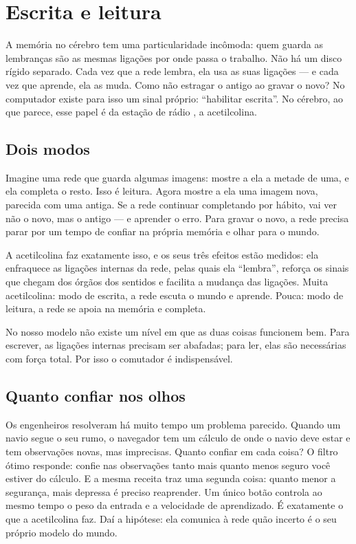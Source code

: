 \chapter{Escrita e leitura}

A memória no cérebro tem uma particularidade incômoda: quem guarda as lembranças são as mesmas ligações por onde passa o trabalho. Não há um disco rígido separado. Cada vez que a rede lembra, ela usa as suas ligações --- e cada vez que aprende, ela as muda. Como não estragar o antigo ao gravar o novo? No computador existe para isso um sinal próprio: ``habilitar escrita''. No cérebro, ao que parece, esse papel é da estação de rádio , a acetilcolina.

\section*{Dois modos}

Imagine uma rede que guarda algumas imagens: mostre a ela a metade de uma, e ela completa o resto. Isso é leitura. Agora mostre a ela uma imagem nova, parecida com uma antiga. Se a rede continuar completando por hábito, vai ver não o novo, mas o antigo --- e aprender o erro. Para gravar o novo, a rede precisa parar por um tempo de confiar na própria memória e olhar para o mundo.


A acetilcolina faz exatamente isso, e os seus três efeitos estão medidos: ela enfraquece as ligações internas da rede, pelas quais ela ``lembra'', reforça os sinais que chegam dos órgãos dos sentidos e facilita a mudança das ligações. Muita acetilcolina: modo de escrita, a rede escuta o mundo e aprende. Pouca: modo de leitura, a rede se apoia na memória e completa.

No nosso modelo não existe um nível em que as duas coisas funcionem bem. Para escrever, as ligações internas precisam ser abafadas; para ler, elas são necessárias com força total. Por isso o comutador é indispensável.

\section*{Quanto confiar nos olhos}

Os engenheiros resolveram há muito tempo um problema parecido. Quando um navio segue o seu rumo, o navegador tem um cálculo de onde o navio deve estar e tem observações novas, mas imprecisas. Quanto confiar em cada coisa? O filtro ótimo responde: confie nas observações tanto mais quanto menos seguro você estiver do cálculo. E a mesma receita traz uma segunda coisa: quanto menor a segurança, mais depressa é preciso reaprender. Um único botão controla ao mesmo tempo o peso da entrada e a velocidade de aprendizado. É exatamente o que a acetilcolina faz. Daí a hipótese: ela comunica à rede quão incerto é o seu próprio modelo do mundo.

